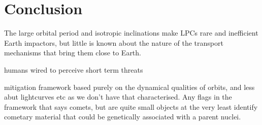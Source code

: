 \chapter{Conclusion}
\label{chap:conclusion}

\lipsum[100]
\lipsum[100]
\lipsum[100]
\lipsum[100]
\lipsum[100]



The large orbital period and isotropic inclinations make LPCs rare and inefficient Earth impactors, but little is known about the nature of the transport mechanisms that bring them close to Earth.

humans wired to perceive short term threats

mitigation framework based purely on the dynamical qualities of orbits, and less abut lightcurves etc as we don't have that characterised. Any flags in the framework that says comets, but are quite small objects at the very least identify cometary material that could be genetically associated with a parent nuclei.